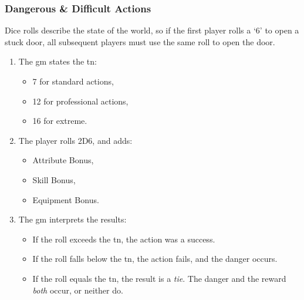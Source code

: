 \subsubsection*{Dangerous \& Difficult Actions}

Dice rolls describe the state of the world, so if the first player rolls a `6' to open a stuck door, all subsequent players must use the same roll to open the door.

\begin{enumerate}
  \item
  The \gls{gm} states the \gls{tn}:

  \begin{itemize}
    \item
    7 for standard actions,
    \item
    12 for professional actions,
    \item
    16 for extreme.
  \end{itemize}
  \item
  The player rolls 2D6, and adds:
  \begin{itemize}
    \item
    Attribute Bonus,
    \item
    Skill Bonus,
    \item
    Equipment Bonus.
  \end{itemize}
  \item
  The \gls{gm} interprets the results:
  \begin{itemize}
    \item
    If the roll exceeds the \gls{tn}, the action was a success.
    \item
    If the roll falls below the \gls{tn}, the action fails, and the danger occurs.
    \item
    If the roll equals the \gls{tn}, the result is a \emph{tie}.
    The danger and the reward \emph{both} occur, or neither do.
    \end{itemize}
\end{enumerate}
